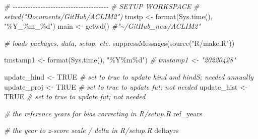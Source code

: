 \documentclass[
]{article}
\newenvironment{Shaded}{\begin{snugshade}}{\end{snugshade}}
\newcommand{\CommentTok}[1]{\textcolor[rgb]{0.56,0.35,0.01}{\textit{#1}}}
\newcommand{\ConstantTok}[1]{\textcolor[rgb]{0.00,0.00,0.00}{#1}}
\newcommand{\FunctionTok}[1]{\textcolor[rgb]{0.00,0.00,0.00}{#1}}
\newcommand{\NormalTok}[1]{#1}
\newcommand{\OtherTok}[1]{\textcolor[rgb]{0.56,0.35,0.01}{#1}}
\newcommand{\StringTok}[1]{\textcolor[rgb]{0.31,0.60,0.02}{#1}}
\begin{document}
\begin{Shaded}
\begin{Highlighting}[]
    \CommentTok{\# {-}{-}{-}{-}{-}{-}{-}{-}{-}{-}{-}{-}{-}{-}{-}{-}{-}{-}{-}{-}{-}{-}{-}{-}{-}{-}{-}{-}{-}{-}{-}{-}{-}{-}{-}{-}{-}{-}}
    \CommentTok{\# SETUP WORKSPACE}
    \CommentTok{\# setwd("Documents/GitHub/ACLIM2")}
\NormalTok{    tmstp  }\OtherTok{\textless{}{-}} \FunctionTok{format}\NormalTok{(}\FunctionTok{Sys.time}\NormalTok{(), }\StringTok{"\%Y\_\%m\_\%d"}\NormalTok{)}
\NormalTok{    main   }\OtherTok{\textless{}{-}} \FunctionTok{getwd}\NormalTok{()  }\CommentTok{\#"\textasciitilde{}/GitHub\_new/ACLIM2"}
    
    \CommentTok{\# loads packages, data, setup, etc.}
    \FunctionTok{suppressMessages}\NormalTok{(}\FunctionTok{source}\NormalTok{(}\StringTok{"R/make.R"}\NormalTok{))}
    
\NormalTok{    tmstamp1  }\OtherTok{\textless{}{-}} \FunctionTok{format}\NormalTok{(}\FunctionTok{Sys.time}\NormalTok{(), }\StringTok{"\%Y\%m\%d"}\NormalTok{)}
    \CommentTok{\# tmstamp1  \textless{}{-} "20220428"}
    
\NormalTok{    update\_hind  }\OtherTok{\textless{}{-}} \ConstantTok{TRUE}   \CommentTok{\# set to true to update hind and hindS; needed annually}
\NormalTok{    update\_proj  }\OtherTok{\textless{}{-}} \ConstantTok{TRUE}   \CommentTok{\# set to true to update fut; not needed}
\NormalTok{    update\_hist  }\OtherTok{\textless{}{-}} \ConstantTok{TRUE}   \CommentTok{\# set to true to update fut; not needed}
     
    \CommentTok{\# the reference years for bias correcting in R/setup.R}
\NormalTok{    ref\_years }
    
    \CommentTok{\# the year to z{-}score scale / delta in R/setup.R}
\NormalTok{    deltayrs }
    

\end{Highlighting}
\end{Shaded}
\end{document}
